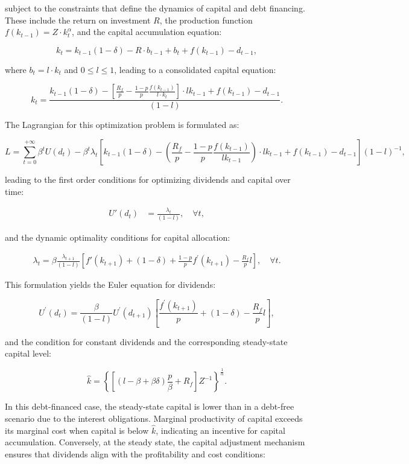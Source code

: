 \documentclass[12pt]{article}
\begin{document}
subject to the constraints that define the dynamics of capital and debt financing. These include the return on
investment \(R\), the  production function \(f(k_{t-1}) = Z \cdot k_t^\alpha\), and the capital accumulation equation:

\[
k_t = k_{t-1}(1 - \delta) - R \cdot b_{t-1} + b_{t} + f(k_{t-1}) - d_{t-1},
\]

where \(b_t = l \cdot k_t\) and \(0 \leq l \leq 1\), leading to a consolidated capital equation:

\[
k_t = \frac{k_{t-1}(1 - \delta) - \left[\frac{R_f}{p}  -\frac{ 1-p }{ p }\frac{f(k_{t-1})}{l \cdot k_t}\right] \cdot l k_{t-1} + f(k_{t-1}) - d_{t-1}}{\left(1-l\right)}.
\]

The Lagrangian for this optimization problem is formulated as:

\[
L=\sum_{t=0}^{+\infty}\beta^t U(d_t) - \beta^t \lambda_t\left[k_{t-1}(1 - \delta) - \left(\frac{R_f}{p}  -\frac{ 1-p }{ p }\frac{f(k_{t-1})}{l k_{t-1}}\right) \cdot l k_{t-1} + f(k_{t-1}) - d_{t-1}\right]{\left(1-l\right)}^{-1},
\]

leading to the first order conditions for optimizing dividends and capital over time:

\[
\begin{aligned}
    U'(d_t) &= \frac{\lambda_t}{\left(1-l\right)}, \quad \forall t,
\end{aligned}
\]

and the dynamic optimality conditions for capital allocation:

\[
\begin{aligned}
    \lambda_t = \beta \frac{\lambda_{t+1}}{\left(1-l\right)} \left[ f'(k_{t+1}) + (1 - \delta) + \frac{ 1-p }{ p } f^{\prime}(k_{t+1}) - \frac{R_f}{p}l \right], \quad \forall t.
\end{aligned}
\]

This formulation yields the Euler equation for dividends:

\[
U^{\prime}(d_{t})=\frac{\beta}{\left(1-l\right)} U^{\prime}(d_{t+1})\left[\frac{f^{\prime}(k_{t+1})}{p}+(1-\delta) - \frac{R_f}{p}l\right],
\]

and the condition for constant dividends and the corresponding steady-state capital level:

\[
\widehat{k} = \left\{\left[\left(l - \beta + \beta \delta \right)\frac{p}{\beta}+R_f\right]Z^{-1}\right\}^{\frac{1}{\alpha}}.
\]

In this debt-financed case, the steady-state capital is lower than in a debt-free scenario due to the interest
obligations. Marginal productivity of capital exceeds its marginal cost when capital is below \(\widehat{k}\),
indicating an incentive for capital accumulation. Conversely, at the steady state, the capital adjustment  mechanism
ensures that dividends align with the profitability and cost conditions:
\end{document}
